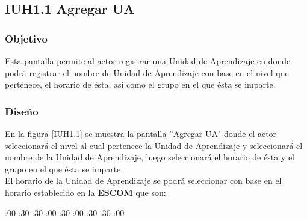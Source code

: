\subsection{IUH1.1 Agregar UA}

\subsubsection{Objetivo}

Esta pantalla permite al actor registrar una Unidad de Aprendizaje en donde podrá registrar el nombre de Unidad de Aprendizaje con base en el nivel que pertenece, el horario de ésta, así como el grupo en el que ésta se imparte.

\subsubsection{Diseño}

En la figura \ref{IUH1.1} se muestra la pantalla ''Agregar UA" donde el actor seleccionará el nivel al cual pertenece la Unidad de Aprendizaje y seleccionará el nombre de la Unidad de Aprendizaje, luego seleccionará el horario de ésta y el grupo en el que ésta se imparte.\\

El horario de la Unidad de Aprendizaje se podrá seleccionar con base en el horario establecido en la \textbf{ESCOM} que son: \\

\begin{UClist}

	:00
	:30
	:30
	:00
	:30
	:00
	:30
	:30
	:00

\end{UClist}

